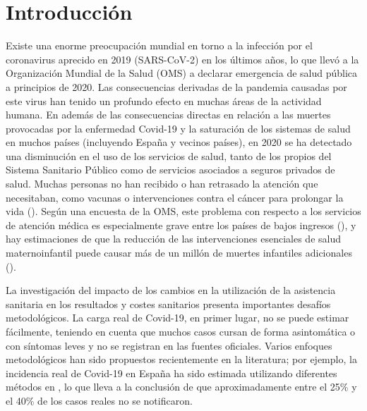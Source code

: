 \documentclass[12pt,twoside]{article} %
\begin{document}
\tableofcontents\bueceemptypage
\listoffigures\bueceemptypage
\listoftables\bueceemptypage

\buecereportheaders

\setcounter{page}{1}

\section{Introducción}  %
Existe una enorme preocupación mundial en torno a la infección por el coronavirus aprecido en 2019 (SARS-CoV-2)
en los últimos años, lo que llevó a la Organización Mundial de la Salud (OMS) a declarar
emergencia de salud pública a principios de 2020. Las consecuencias derivadas de la pandemia
causadas por este virus han tenido un profundo efecto en muchas áreas de la actividad humana. En
además de las consecuencias directas en relación a las muertes provocadas por la enfermedad Covid-19
y la saturación de los sistemas de salud en muchos países (incluyendo España y vecinos
países), en 2020 se ha detectado una disminución en el uso de los servicios de salud, tanto
de los propios del Sistema Sanitario Público como de servicios asociados a seguros privados de salud. Muchas personas no han recibido o han retrasado la atención que necesitaban, como vacunas o intervenciones contra el cáncer para prolongar la vida (\cite{baum_admissions_2020, mcdonald_early_2020, maringe_impact_2020}). Según una encuesta de la OMS, este problema con respecto a los servicios de atención médica es especialmente grave entre los países de bajos ingresos (\cite{noauthor_pulse_nodate}), y hay estimaciones de que la reducción de las intervenciones esenciales de salud maternoinfantil puede causar más de un millón de muertes infantiles adicionales (\cite{roberton_early_2020}). 

La investigación del impacto de los cambios en la utilización de la asistencia sanitaria en los resultados y costes sanitarios presenta importantes desafíos metodológicos. La carga real de Covid-19, en primer lugar, no se puede estimar fácilmente, teniendo en cuenta que muchos casos cursan de forma asintomática o con síntomas leves y no se registran en las fuentes oficiales. Varios enfoques metodológicos han sido propuestos recientemente en la literatura; por ejemplo, la incidencia real de Covid-19 en España ha sido estimada utilizando diferentes métodos en \cite{fernandez-fontelo_estimating_2020, morina_cumulated_2021}, lo que lleva a la conclusión de que aproximadamente entre el 25\% y el 40\% de los casos reales no se notificaron.
\end{document}
